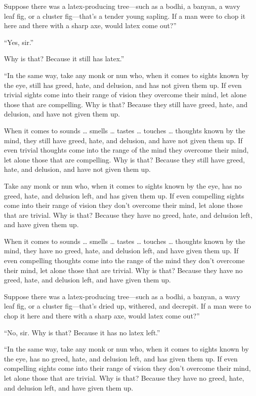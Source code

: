 \documentclass[12pt,openany]{book}%
\begin{document}
Suppose there was a latex-producing tree—such as a bodhi, a banyan, a wavy leaf fig, or a cluster fig—that’s a tender young sapling. If a man were to chop it here and there with a sharp axe, would latex come out?” 

“Yes, sir.” 

Why is that? Because it still has latex.” 

“In the same way, take any monk or nun who, when it comes to sights known by the eye, still has greed, hate, and delusion, and has not given them up. If even trivial sights come into their range of vision they overcome their mind, let alone those that are compelling. Why is that? Because they still have greed, hate, and delusion, and have not given them up. 

When it comes to sounds … smells … tastes … touches … thoughts known by the mind, they still have greed, hate, and delusion, and have not given them up. If even trivial thoughts come into the range of the mind they overcome their mind, let alone those that are compelling. Why is that? Because they still have greed, hate, and delusion, and have not given them up. 

Take any monk or nun who, when it comes to sights known by the eye, has no greed, hate, and delusion left, and has given them up. If even compelling sights come into their range of vision they don’t overcome their mind, let alone those that are trivial. Why is that? Because they have no greed, hate, and delusion left, and have given them up. 

When it comes to sounds … smells … tastes … touches … thoughts known by the mind, they have no greed, hate, and delusion left, and have given them up. If even compelling thoughts come into the range of the mind they don’t overcome their mind, let alone those that are trivial. Why is that? Because they have no greed, hate, and delusion left, and have given them up. 

Suppose there was a latex-producing tree—such as a bodhi, a banyan, a wavy leaf fig, or a cluster fig—that’s dried up, withered, and decrepit. If a man were to chop it here and there with a sharp axe, would latex come out?” 

“No, sir. Why is that? Because it has no latex left.” 

“In the same way, take any monk or nun who, when it comes to sights known by the eye, has no greed, hate, and delusion left, and has given them up. If even compelling sights come into their range of vision they don’t overcome their mind, let alone those that are trivial. Why is that? Because they have no greed, hate, and delusion left, and have given them up. 
\end{document}
